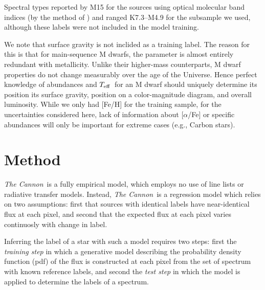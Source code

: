 \documentclass[modern]{aastex62}
\newcommand{\thecannon}{\textsl{The Cannon}}
\newcommand{\teff}{$T_{\rm eff}$}
\begin{document}
Spectral types reported by M15 for the sources using optical molecular band indices (by the method of \citealt{Lepine:2013}) and ranged K7.3--M4.9 for the subsample we used, although these labels were not included in the model training.

We note that surface gravity is not inclided as a training label. The reason for this is that for main-sequence M dwarfs, the parameter is almost entirely redundant with metallicity. Unlike their higher-mass counterparts, M dwarf properties do not change measurably over the age of the Universe. Hence perfect knowledge of abundances and \teff\ for an M dwarf should uniquely determine its position its surface gravity, position on a color-magnitude diagram, and overall luminosity. While we only had [Fe/H] for the training sample, for the uncertainties considered here, lack of information about [$\alpha$/Fe] or specific abundances will only be important for extreme cases (e.g., Carbon stars). 




\section{Method}\label{sec:cannon}

\thecannon\ is a fully empirical model, which employs no use of line lists or radiative transfer models. Instead, \thecannon\ is a regression model which relies on two assumptions: first that sources with identical labels have near-identical flux at each pixel, and second that the expected flux at each pixel varies continuosly with change in label. 

Inferring the label of a star with such a model requires two steps: first the \emph{training step} in which a generative model describing the probability density function (pdf) of the flux is constructed at each pixel from the set of spectrum with known reference labels, and second the \emph{test step} in which the model is applied to determine the labels of a spectrum.
\end{document}
